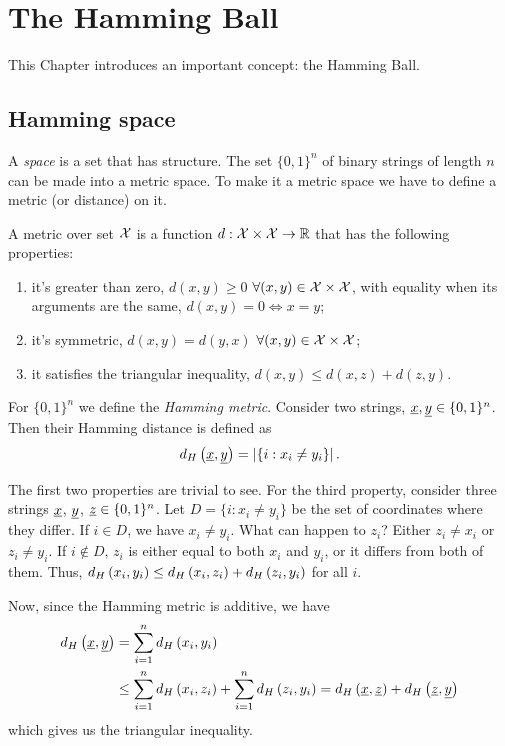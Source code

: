 \chapter{The Hamming Ball}

This Chapter introduces an important concept: the Hamming Ball.

\section{Hamming space}

A \emph{space} is a set that has structure.
The set $\{0,1\}^{n}$ of binary strings of length $n$ can be made into a metric space.
To make it a metric space we have to define a metric (or distance) on it.

A metric over set $\mathcal{X}$ is a function $d: \mathcal{X} \times \mathcal{X} \rightarrow \mathbb{R}$ that has the following properties:
\begin{enumerate}
	\item it's greater than zero, \ie $d(x, y) \geq 0$ $\forall (x, y) \in \mathcal{X} \times \mathcal{X}$, with equality when its arguments are the same, \ie $d(x, y) = 0 \iff x = y$;
	\item it's symmetric, \ie $d(x, y) = d(y, x)$ $\forall (x, y) \in \mathcal{X} \times \mathcal{X}$;
	\item it satisfies the triangular inequality, \ie $d(x, y) \leq d(x, z) + d(z, y)$.
\end{enumerate}

For $\{0,1\}^{n}$ we define the \emph{Hamming metric}.
Consider two strings, $\underline{x}, \underline{y}  \in \{0, 1\}^n$.
Then their Hamming distance is defined as
\begin{equation}
	d_H \left({\underline{x}, \underline{y}}\right) = \left|{\{i : x_i \not= y_i\}}\right|.
\end{equation}

The first two properties are trivial to see.
For the third property, consider three strings $\underline{x}$, $\underline{y}$, $\underline{z} \in \{0,1\}^n$.
Let $D = \{i : x_i \not= y_i\}$ be the set of coordinates where they differ.
If $i \in D$, we have $x_{i} \neq y_{i}$.
What can happen to $z_{i}$?
Either $z_{i} \neq x_{i}$ or $z_{i} \neq y_{i}$.
If $i \not\in D$, $z_{i}$ is either equal to both $x_{i}$ and $y_{i}$, or it differs from both of them.
Thus, $d_H \left({x_{i},y_{i}}\right) \le d_H \left({x_{i},z_{i}}\right) + d_H \left({z_{i},y_{i}}\right)$ for all $i$.

Now, since the Hamming metric is additive, we have
\begin{align*}
	d_H \left({\underline{x},\underline{y}}\right) & =
	\sum_{i = 1}^n d_H \left({x_i,y_i}\right) \\
	& \le
	\sum_{i = 1}^n d_H \left({x_i,z_i}\right) +
	\sum_{i = 1}^n d_H \left({z_i,y_i}\right)
	=
	d_H \left({\underline{x},\underline{z}}\right) +
	d_H \left({\underline{z},\underline{y}}\right)
\end{align*}
which gives us the triangular inequality.

